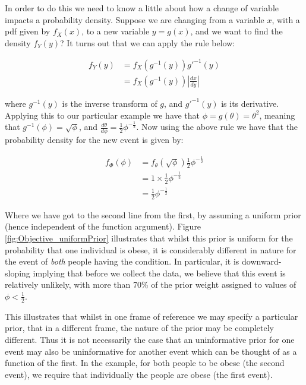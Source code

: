 \documentclass[11pt,fullpage]{book}
\begin{document}
In order to do this we need to know a little about how a change of variable impacts a probability density. Suppose we are changing from a variable $x$, with a pdf given by $f_X(x)$, to a new variable $y=g(x)$, and we want to find the density $f_Y(y)$? It turns out that we can apply the rule below:

\begin{equation}\label{eq:Objective_jacobianTransform}
\begin{align}
f_Y(y) &= f_X(g^{-1}(y)) g'^{-1}(y)\\
&= f_X(g^{-1}(y)) |\frac{dx}{dy}|
\end{align}
\end{equation}

where $g^{-1}(y)$ is the inverse transform of $g$, and $g'^{-1}(y)$ is its derivative. Applying this to our particular example we have that $\phi=g(\theta) = \theta^2$, meaning that $g^{-1}(\phi) = \sqrt{\phi}$, and $\frac{d\theta}{d\phi}= \frac{1}{2}\phi^{-\frac{1}{2}}$. Now using the above rule we have that the probability density for the new event is given by:

\begin{equation}
\begin{align}
f_\Phi(\phi) &= f_\theta(\sqrt{\phi}) \frac{1}{2}\phi^{-\frac{1}{2}}\\
&= 1 \times \frac{1}{2}\phi^{-\frac{1}{2}}\\
&= \frac{1}{2}\phi^{-\frac{1}{2}}
\end{align}
\end{equation}

Where we have got to the second line from the first, by assuming a uniform prior (hence independent of the function argument). Figure \ref{fig:Objective_uniformPrior} illustrates that whilst this prior is uniform for the probability that one individual is obese, it is considerably different in nature for the event of \textit{both} people having the condition. In particular, it is downward-sloping implying that before we collect the data, we believe that this event is relatively unlikely, with more than 70\% of the prior weight assigned to values of $\phi<\frac{1}{2}$.

This illustrates that whilst in one frame of reference we may specify a particular prior, that in a different frame, the nature of the prior may be completely different. Thus it is not necessarily the case that an uninformative prior for one event may also be uninformative for another event which can be thought of as a function of the first. In the example, for both people to be obese (the second event), we require that individually the people are obese (the first event).
\end{document}
